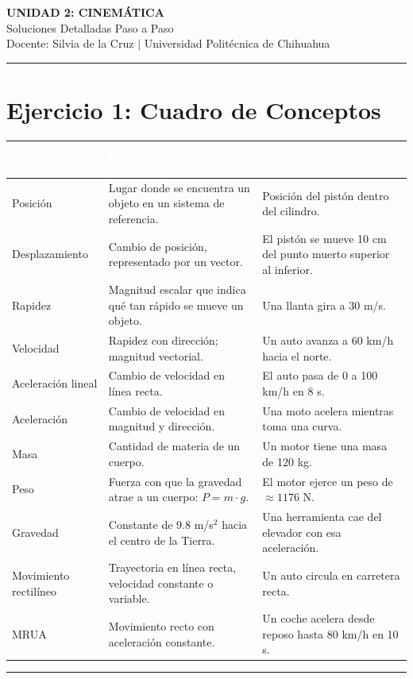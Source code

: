 \documentclass[10pt,a4paper]{article}
\begin{document}
\thispagestyle{fancy}
\begin{center}
  {\Huge\bfseries\color{azul} UNIDAD 2: CINEMÁTICA}\\[4pt]
  {\large\color{gris} Soluciones Detalladas Paso a Paso}\\[4pt]
  {\color{gris} Docente: Silvia de la Cruz $|$ Universidad Politécnica de Chihuahua}
\end{center}
\vspace{6pt}\hrule height 0.5pt\vspace{10pt}
\section{Ejercicio 1: Cuadro de Conceptos}
\begin{tabularx}{\textwidth}{LLL}
  \toprule{}
  \textbf{\textcolor{white}{Concepto}} & \textbf{\textcolor{white}{Definición}} & \textbf{\textcolor{white}{Ejemplo aplicado a mecánica}} \\
  \midrule
  Posición & Lugar donde se encuentra un objeto en un sistema de referencia. & Posición del pistón dentro del cilindro. \\
  Desplazamiento & Cambio de posición, representado por un vector. & El pistón se mueve 10 cm del punto muerto superior al inferior. \\
  Rapidez & Magnitud escalar que indica qué tan rápido se mueve un objeto. & Una llanta gira a 30 m/s. \\
  Velocidad & Rapidez con dirección; magnitud vectorial. & Un auto avanza a 60 km/h hacia el norte. \\
  Aceleración lineal & Cambio de velocidad en línea recta. & El auto pasa de 0 a 100 km/h en 8 s. \\
  Aceleración & Cambio de velocidad en magnitud y dirección. & Una moto acelera mientras toma una curva. \\
  Masa & Cantidad de materia de un cuerpo. & Un motor tiene una masa de 120 kg. \\
  Peso & Fuerza con que la gravedad atrae a un cuerpo: $P = m\cdot g$. & El motor ejerce un peso de $\approx 1176$ N. \\
  Gravedad & Constante de $9.8$ m/s$^2$ hacia el centro de la Tierra. & Una herramienta cae del elevador con esa aceleración. \\
  Movimiento rectilíneo & Trayectoria en línea recta, velocidad constante o variable. & Un auto circula en carretera recta. \\
  MRUA & Movimiento recto con aceleración constante. & Un coche acelera desde reposo hasta 80 km/h en 10 s. \\
  \bottomrule
\end{tabularx}
\vspace{8pt}\hrule height 0.5pt\vspace{10pt}
\end{document}
